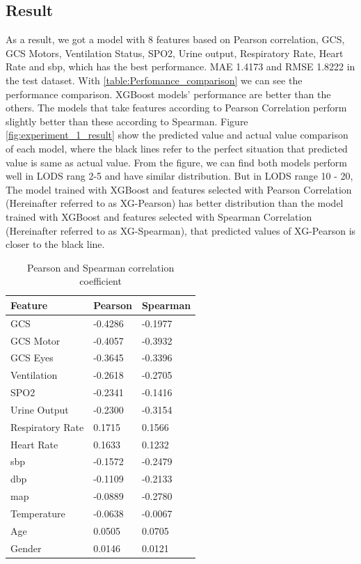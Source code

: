 \documentclass[12pt,a4paper,english
]{tunithesis}
\begin{document}
\subsection{Result}
As a result, we got a model with 8 features based on Pearson correlation, GCS, GCS Motors, Ventilation Status, SPO2, Urine output, Respiratory Rate, Heart Rate and sbp, which has the best performance. MAE 1.4173 and RMSE 1.8222 in the test dataset. With \ref{table:Perfomance_comparison} we can see the performance comparison. XGBoost models' performance are better than the others. The models that take features according to Pearson Correlation perform slightly better than these according to Spearman. Figure \ref{fig:experiment_1_result} show the predicted value and actual value comparison of each model, where the black lines refer to the perfect situation that predicted value is same as actual value. From the figure, we can find both models perform well in LODS rang 2-5 and have similar distribution. But in LODS range 10 - 20, The model trained with XGBoost and features selected with Pearson Correlation (Hereinafter referred to as XG-Pearson) has better distribution than the model trained with XGBoost and features selected with Spearman Correlation (Hereinafter referred to as XG-Spearman), that predicted values of XG-Pearson is closer to the black line.

\begin{table}[]
\centering
    \caption{Pearson and Spearman correlation coefficient}
    \label{table:cc_value}
    \begin{tabular}{|l|l|l|}
        \hline
        \textbf{Feature} & \textbf{Pearson} & \textbf{Spearman} \\ \hline
            GCS & -0.4286 & -0.1977 \\ \hline
            GCS Motor & -0.4057 & -0.3932 \\ \hline
            GCS Eyes & -0.3645 & -0.3396 \\ \hline
            Ventilation & -0.2618 & -0.2705 \\ \hline
            SPO2 & -0.2341 & -0.1416 \\ \hline
            Urine Output & -0.2300 & -0.3154 \\ \hline
            Respiratory Rate & 0.1715 & 0.1566\\ \hline
            Heart Rate & 0.1633 & 0.1232 \\ \hline
            sbp & -0.1572 & -0.2479 \\ \hline
            dbp & -0.1109 & -0.2133 \\ \hline
            map & -0.0889 & -0.2780 \\ \hline
            Temperature & -0.0638 & -0.0067 \\ \hline
            Age & 0.0505 & 0.0705 \\ \hline
            Gender & 0.0146 & 0.0121 \\ \hline
    \end{tabular}
\end{table}
\end{document}
